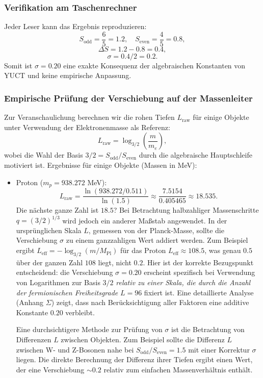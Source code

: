 \documentclass[12pt,a4paper]{article}
\begin{document}
	\subsubsection{Verifikation am Taschenrechner}
	
	Jeder Leser kann das Ergebnis reproduzieren:
	\[
	S_{\mathrm{odd}} = \frac{6}{5} = 1.2,\quad S_{\mathrm{even}} = \frac{4}{5} = 0.8,
	\]
	\[
	\Delta S = 1.2 - 0.8 = 0.4,
	\]
	\[
	\sigma = 0.4 / 2 = 0.2.
	\]
	Somit ist \(\sigma = 0.20\) eine exakte Konsequenz der algebraischen Konstanten von YUCT und keine empirische Anpassung.
	
	\subsubsection{Empirische Prüfung der Verschiebung auf der Massenleiter}
	
	Zur Veranschaulichung berechnen wir die rohen Tiefen \(L_{\mathrm{raw}}\) für einige Objekte unter Verwendung der Elektronenmasse als Referenz:
	\[
	L_{\mathrm{raw}} = \log_{3/2}\left( \frac{m}{m_e} \right),
	\]
	wobei die Wahl der Basis \(3/2 = S_{\mathrm{odd}}/S_{\mathrm{even}}\) durch die algebraische Hauptschleife motiviert ist. Ergebnisse für einige Objekte (Massen in MeV):
	\begin{itemize}
		\item Proton (\(m_p = 938.272\) MeV):
		\[
		L_{\mathrm{raw}} = \frac{\ln(938.272 / 0.511)}{\ln(1.5)} \approx \frac{7.5154}{0.405465} \approx 18.535.
		\]
		Die nächste ganze Zahl ist \(18.5\)? Bei Betrachtung halbzahliger Massenschritte \(q = (3/2)^{1/3}\) wird jedoch ein anderer Maßstab angewendet. In der ursprünglichen Skala \(L\), gemessen von der Planck-Masse, sollte die Verschiebung \(\sigma\) zu einem ganzzahligen Wert addiert werden. Zum Beispiel ergibt \(L_{\mathrm{eff}} = -\log_{3/2}(m/M_{\mathrm{Pl}})\) für das Proton \(L_{\mathrm{eff}} \approx 108.5\), was genau \(0.5\) über der ganzen Zahl \(108\) liegt, nicht \(0.2\). Hier ist der korrekte Bezugspunkt entscheidend: die Verschiebung \(\sigma = 0.20\) erscheint spezifisch bei Verwendung von Logarithmen zur Basis \(3/2\) \emph{relativ zu einer Skala, die durch die Anzahl der fermionischen Freiheitsgrade} \(L=96\) fixiert ist. Eine detaillierte Analyse (Anhang \(\Sigma\)) zeigt, dass nach Berücksichtigung aller Faktoren eine additive Konstante \(0.20\) verbleibt.
		
		Eine durchsichtigere Methode zur Prüfung von \(\sigma\) ist die Betrachtung von Differenzen \(L\) zwischen Objekten. Zum Beispiel sollte die Differenz \(L\) zwischen W- und Z-Bosonen nahe bei \(S_{\mathrm{odd}}/S_{\mathrm{even}} = 1.5\) mit einer Korrektur \(\sigma\) liegen. Die direkte Berechnung der Differenz ihrer Tiefen ergibt einen Wert, der eine Verschiebung \(\sim 0.2\) relativ zum einfachen Massenverhältnis enthält.
	\end{itemize}
	
\end{document}

